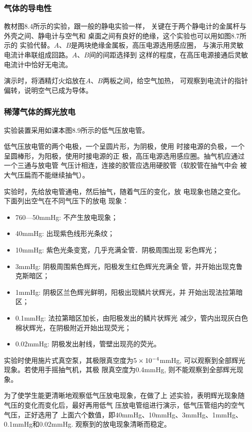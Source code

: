 \subsubsection{气体的导电性}
教材图8.4所示的实验，跟一般的静电实验一样，
关键在于两个静电计的金属杆与外壳之间、静电计与空气和
桌面之间有良好的绝缘，这个实验也可以用如图8.7所示的
实验代替。$A$、$B$是两块绝缘金属板，高压电源选用感应圈，
与演示用灵敏电流计串联组成回路。$A$、$B$间的间距选择到
这样的程度，在高压电源接通后灵敏电流计中恰好无电流。

演示时，将酒精灯火焰放在$A$、$B$两板之间，给空气加热，
可观察到电流计的指针偏转，说明空气已成为导体。

\subsubsection{稀薄气体的辉光放电}
实验装置采用如课本图8.9所示的低气压放电管。

低气压放电管的两个电极，一个呈圆片形，为阴极，使用
时接电源的负极，一个呈圆棒形，为阳极，使用时接电源的正
极，高压电源选用感应圈。抽气机应通过一个三通与放电管
气压计相连，连接的胶管应选用硬胶管（软胶管在抽气中会
被大气压扁而不能继续抽气）。

实验时，先给放电管通电，然后抽气，随着气压的变化，放
电现象也随之变化。下面列出空气在不同气压下的放电
现象：
\begin{itemize}
\item 760—50mmHg: 不产生放电现象；
\item 40mmHg: 出现紫色线形光条纹；
\item 10mmHg: 紫色光条变宽，几乎充满全管．阴极周围出现
彩色辉光；
\item 3mmHg: 阴极周围紫色辉光，阳极发生红色辉光充满全
管，并开始出现克鲁克斯暗区；
\item 1mmHg: 阴极区兰色辉光鲜明，阳极出现鳞片状辉光，并
开始出现法拉第暗区；
\item 0.1mmHg: 法拉第暗区加长，由阳极发出的鳞片状辉光
减少，管内出现灰白色棉状辉光，在阴极附近开始出现荧光；
\item 0.02mmHg: 阴极发出射线，管壁出现亮的荧光。
\end{itemize}

实验时使用施片式真空泵，其极限真空度为$5\times10^{-4}$mmHg, 可以观察到全部辉光现象。若使用手摇抽气机，其极
限真空度为0.4mmHg, 则不能观察到全部辉光现象。

为了使学生能更清晰地观察低气压放电现象，在做了上
述实验，表明辉光现象随气压的变化而变化后，最好再用低气
压放电管组进行演示，低气压管组内的空气气压，正好选用了
上面六个数值，即40mmHg、10mmHg、3mmHg、1mmHg、
0.1mmHg和0.02mmHg. 观察到的放电现象清晰而稳定。

